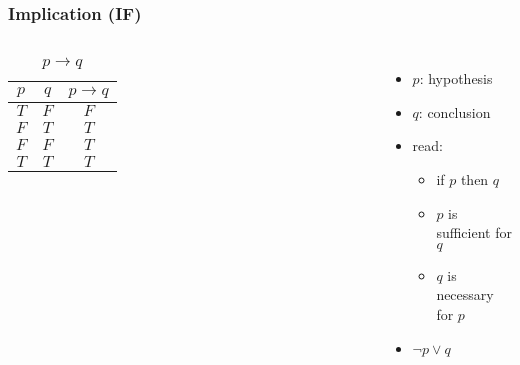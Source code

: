 \documentclass[dvipsnames]{beamer}
\begin{document}
\begin{frame}
  \frametitle{Implication (IF)}

  \begin{columns}
    \begin{table}
      \caption{$p \rightarrow q$}
      \begin{tabular}{|c|c||c|}\hline
        $p$ & $q$ & $p \rightarrow q$\\\hline\hline
        $T$ & $F$ & $F$\\\hline
        $F$ & $T$ & $T$\\\hline
        $F$ & $F$ & $T$\\\hline
        $T$ & $T$ & $T$\\\hline
      \end{tabular}
    \end{table}

    \pause
    \begin{itemize}
      \item $p$: \alert{hypothesis}
      \item $q$: \alert{conclusion}

      \item read:
      \begin{itemize}
        \item if $p$ then $q$
        \item $p$ is sufficient for $q$
        \item $q$ is necessary for $p$
      \end{itemize}

      \pause
      \item $\neg p \vee q$
    \end{itemize}
  \end{columns}
\end{frame}
\end{document}
